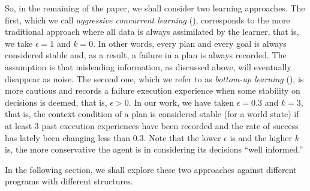 So, in the remaining of the paper, we shall consider two learning approaches. The
first, which we call \emph{aggressive concurrent learning} (\CL), corresponds to
the more traditional approach where all data is always assimilated by the
learner, that is, we take $\epsilon = 1$ and $k = 0$. In other words, every plan
and every goal is always considered stable and, as a result, a failure in a plan
is always recorded. The assumption is that misleading information, as discussed
above, will eventually disappear as noise.
The second one, which we refer to as \emph{bottom-up learning} (\BUL), is more
cautious and records a failure execution experience when some stability on
decisions is deemed, that is, $\epsilon > 0$. In our work, we have taken
$\epsilon = 0.3$ and $k = 3$, that is, the context condition of a
plan is considered stable (for a world state) if at least $3$ past execution experiences 
have been recorded and the rate of success has lately been changing less than $0.3$.
Note that the lower $\epsilon$ is and the higher $k$ is, the more conservative
the agent is in considering its decisions ``well informed.''

In the following section, we shall explore these two approaches against
different programs with different structures.




